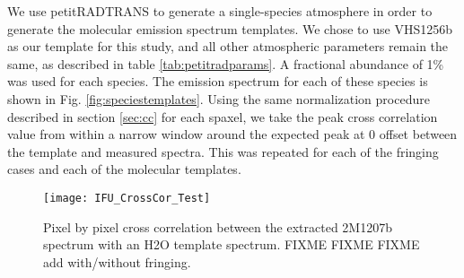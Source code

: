 We use petitRADTRANS to generate a single-species atmosphere in order to generate the molecular emission spectrum templates. 
We chose to use VHS1256b as our template for this study, and all other atmospheric parameters remain the same, as described in table \ref{tab:petitradparams}. 
A fractional abundance of 1\% was used for each species.
The emission spectrum for each of these species is shown in Fig. \ref{fig:speciestemplates}.
Using the same normalization procedure described in section \ref{sec:cc} for each spaxel, we take the peak cross correlation value from within a narrow window around the expected peak at 0 offset between the template and measured spectra. 
This was repeated for each of the fringing cases and each of the molecular templates. 
\begin{figure}[t]
	\centering
	\texttt{[image: IFU\_CrossCor\_Test]}
	\caption{Pixel by pixel cross correlation between the extracted 2M1207b spectrum with an H2O template spectrum. FIXME FIXME FIXME add with/without fringing.}
	\label{fig:h2omap}
\end{figure}